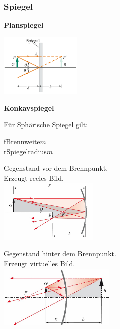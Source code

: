 \subsubsection{Spiegel}

\textbf{Planspiegel}
\begin{center}
	\includegraphics[height=3cm,keepaspectratio=true]{Images/planspiegel.png}
\end{center}


\textbf{Konkavspiegel}

\begin{center}
	\begin{minipage}{0.3\textwidth}
		Für Sphärische Spiegel gilt:
	\end{minipage}%
	\begin{minipage}{0.3\textwidth}
		\unit{f}{Brennweite}{$m$} \\
		\unit{r}{Spiegelradius}{$m$}
	\end{minipage}
\end{center}

\begin{center}
	\begin{minipage}{0.3\textwidth}
		Gegenstand vor dem Brennpunkt. \\
		Erzeugt reeles Bild. \\
		\includegraphics[height=3cm,keepaspectratio=true]{Images/konkavspiegel1.png}
	\end{minipage}%
	\begin{minipage}{0.3\textwidth}
		Gegenstand hinter dem Brennpunkt. \\
		Erzeugt virtuelles Bild. \\
		\includegraphics[height=3cm,keepaspectratio=true]{Images/konkavspiegel2.png}
	\end{minipage}
\end{center}


